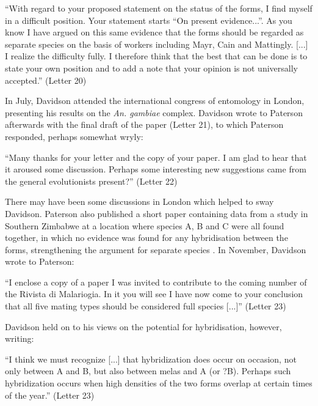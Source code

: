 \documentclass[a4paper,11pt,abstracton,hidelinks]{scrartcl}
\begin{document}
\begin{displayquote}
``With regard to your proposed statement on the status of the forms, I find myself in a difficult position. Your statement starts ``On present evidence...''. As you know I have argued on this same evidence that the forms should be regarded as separate species on the basis of workers including Mayr, Cain and Mattingly. [...] I realize the difficulty fully. I therefore think that the best that can be done is to state your own position and to add a note that your opinion is not universally accepted.'' (Letter 20)
\end{displayquote}


In July, Davidson attended the international congress of entomology in London, presenting his results on the \textit{An. gambiae} complex. Davidson wrote to Paterson afterwards with the final draft of the paper (Letter 21), to which Paterson responded, perhaps somewhat wryly:


\begin{displayquote}
``Many thanks for your letter and the copy of your paper. I am glad to hear that it aroused some discussion. Perhaps some interesting new suggestions came from the general evolutionists present?'' (Letter 22)
\end{displayquote}


There may have been some discussions in London which helped to sway Davidson. Paterson also published a short paper containing data from a study in Southern Zimbabwe at a location where species A, B and C were all found together, in which no evidence was found for any hybridisation between the forms, strengthening the argument for separate species \citep{Paterson1964}. In November, Davidson wrote to Paterson:


\begin{displayquote}
``I enclose a copy of a paper I was invited to contribute to the coming number of the Rivista di Malariogia. In it you will see I have now come to your conclusion that all five mating types should be considered full species [...]'' (Letter 23)
\end{displayquote}


Davidson held on to his views on the potential for hybridisation, however, writing:


\begin{displayquote}
``I think we must recognize [...] that hybridization does occur on occasion, not only between A and B, but also between melas and A (or ?B). Perhaps such hybridization occurs when high densities of the two forms overlap at certain times of the year.'' (Letter 23)
\end{displayquote}
\end{document}
